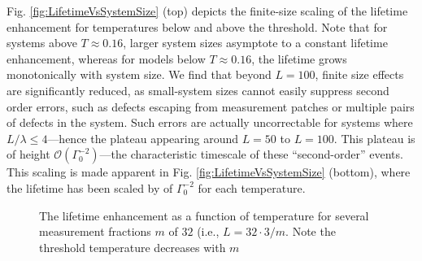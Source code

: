 \documentclass[twocolumn,superscriptaddress,aps,prb,floatfix]{revtex4-1}
\newcommand{\figref}[1]{Fig. \ref{#1}}
\begin{document}
\figref{fig:LifetimeVsSystemSize} (top) depicts the finite-size scaling of the lifetime enhancement for temperatures below and above the threshold.  Note that for systems above $T\approx0.16$, larger system sizes asymptote to a constant lifetime enhancement, whereas for models below $T\approx0.16$, the lifetime grows monotonically with system size.  We find that beyond $L=100$, finite size effects are significantly reduced, as small-system sizes cannot easily suppress second order errors, such as defects escaping from measurement patches or multiple pairs of defects in the system.  Such errors are actually uncorrectable for systems where $L/\lambda \leq 4$---hence the plateau appearing around $L=50$ to $L=100$.  This plateau is of height $\mathcal{O}(\Gamma_0^{-2})$---the characteristic timescale of these ``second-order'' events.  This scaling is made apparent in \figref{fig:LifetimeVsSystemSize} (bottom), where the lifetime has been scaled by of $\Gamma_0^{-2}$ for each temperature.




\begin{figure}
\begin{center}
\end{center}
\caption{The lifetime enhancement as a function of temperature for several measurement fractions $m$ of $32$ (i.e., $L=32\cdot 3/m$.  Note the threshold temperature decreases  with $m$}
\label{fig:LifetimeVsMeasurementFraction}
\end{figure}
\end{document}
